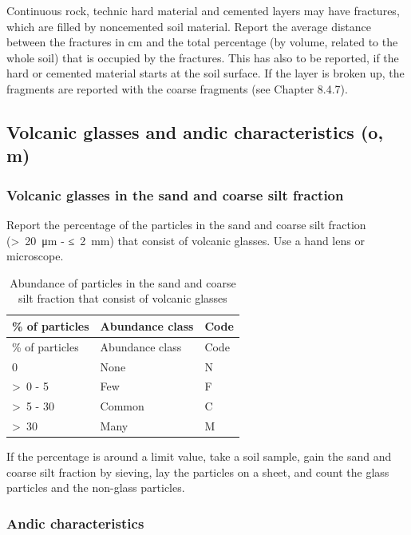 \documentclass[
  letterpaper,
  DIV=11,
  numbers=noendperiod]{scrreprt}
\begin{document}
Continuous rock, technic hard material and cemented layers may have
fractures, which are filled by noncemented soil material. Report the
average distance between the fractures in cm and the total percentage
(by volume, related to the whole soil) that is occupied by the
fractures. This has also to be reported, if the hard or cemented
material starts at the soil surface. If the layer is broken up, the
fragments are reported with the coarse fragments (see Chapter 8.4.7).

\hypertarget{volcanic-glasses-and-andic-characteristics-o-m}{%
\subsection{Volcanic glasses and andic characteristics (o,
m)}\label{volcanic-glasses-and-andic-characteristics-o-m}}

\hypertarget{volcanic-glasses-in-the-sand-and-coarse-silt-fraction}{%
\subsubsection{Volcanic glasses in the sand and coarse silt
fraction}\label{volcanic-glasses-in-the-sand-and-coarse-silt-fraction}}

Report the percentage of the particles in the sand and coarse silt
fraction (\textgreater~20~μm - ≤~2~mm) that consist of volcanic glasses.
Use a hand lens or microscope.

\begin{longtable}[]{@{}lll@{}}
\caption{Abundance of particles in the sand and coarse silt fraction
that consist of volcanic glasses}\tabularnewline
\toprule()
\% of particles & Abundance class & Code \\
\midrule()
\endfirsthead
\toprule()
\% of particles & Abundance class & Code \\
\midrule()
\endhead
0 & None & N \\
\textgreater~0 - 5 & Few & F \\
\textgreater~5 - 30 & Common & C \\
\textgreater~30 & Many & M \\
\bottomrule()
\end{longtable}

If the percentage is around a limit value, take a soil sample, gain the
sand and coarse silt fraction by sieving, lay the particles on a sheet,
and count the glass particles and the non-glass particles.

\hypertarget{andic-characteristics}{%
\subsubsection{Andic characteristics}\label{andic-characteristics}}
\end{document}
